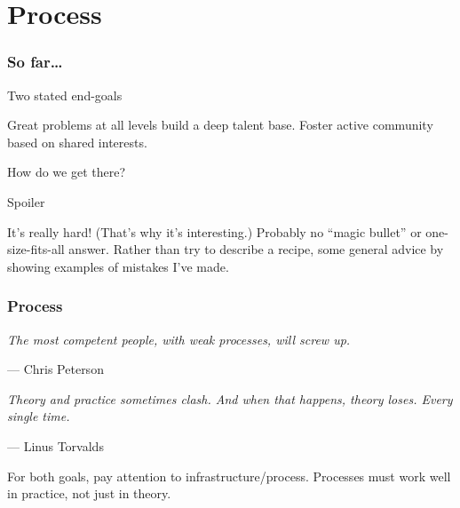 \documentclass[10pt]{beamer}
\begin{document}
\section{Process}
\begin{frame}
  \frametitle{So far\dots}
  \begin{block}{Two stated end-goals}
    \begin{itemize}
      \ii Great problems at all levels build a deep talent base.
      \ii Foster active community based on shared interests.
    \end{itemize}
    How do we get there?
  \end{block}
  \pause
  \begin{alertblock}{Spoiler}
    \begin{itemize}
      \ii It's really hard! (That's why it's interesting.)
      \ii Probably no ``magic bullet'' or one-size-fits-all answer.
      \ii Rather than try to describe a recipe,
      some general advice by showing examples of mistakes I've made.
    \end{itemize}
  \end{alertblock}
\end{frame}
\begin{frame}
  \frametitle{Process}
  \begin{block}{}
    {\slshape
      The most competent people, with weak processes, will screw up.}

    \bigskip \hspace{2em} --- Chris Peterson
  \end{block}
  \begin{block}{}
    {\slshape
      Theory and practice sometimes clash.
      And when that happens, theory loses.
      Every single time.}

    \bigskip \hspace{2em} --- Linus Torvalds
  \end{block}
  \begin{itemize}
    \ii For both goals, pay attention to infrastructure/process.
    \ii Processes must work well in practice, not just in theory.
  \end{itemize}
\end{frame}
\end{document}
